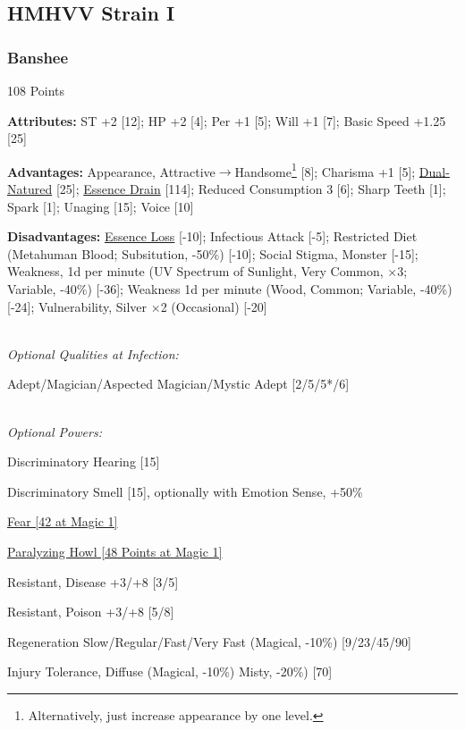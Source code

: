 \begin{multicols*}{3}
	
	\subsection*{HMHVV Strain I}
	
	\subsubsection{Banshee}\label{banshee}
	\begin{flushright}
		108 Points
	\end{flushright}
	
	\textbf{Attributes:}
	ST +2 [12]; HP +2 [4]; Per +1 [5]; Will +1 [7]; Basic Speed +1.25 [25]
	
	\textbf{Advantages:}
	Appearance, Attractive$\rightarrow$Handsome\footnote{Alternatively, just increase appearance by one level.} [8]; Charisma +1 [5]; \hyperref[dual_natured]{Dual-Natured} [25]; \hyperref[essence_drain]{Essence Drain} [114]; Reduced Consumption 3 [6]; Sharp Teeth [1]; Spark [1]; Unaging [15]; Voice [10]
	
	\textbf{Disadvantages:}	
	\hyperref[essence_loss]{Essence Loss} [-10]; Infectious Attack [-5]; Restricted Diet (Metahuman Blood; Subsitution, -50\%) [-10]; Social Stigma, Monster [-15]; Weakness, 1d per minute (UV Spectrum of Sunlight, Very Common, $\times$3; Variable, -40\%) [-36]; Weakness 1d per minute (Wood, Common; Variable, -40\%) [-24]; Vulnerability, Silver $\times$2 (Occasional) [-20]
	
	\textit{\\Optional Qualities at Infection:}
	
	Adept/Magician/Aspected Magician/Mystic Adept [2/5/5*/6]
	
	\textit{\\Optional Powers:}
	
	Discriminatory Hearing [15]
	
	Discriminatory Smell [15], optionally with Emotion Sense, +50\%
	
	\hyperref[fear]{Fear [42 at Magic 1]}
	
	\hyperref[paralyzing_howl]{Paralyzing Howl [48 Points at Magic 1]}
	
	Resistant, Disease +3/+8 [3/5]
	
	Resistant, Poison +3/+8 [5/8]
	
	Regeneration Slow/Regular/Fast/Very Fast (Magical, -10\%) [9/23/45/90]
	
	Injury Tolerance, Diffuse (Magical, -10\%) Misty, -20\%) [70]
	

\end{multicols*}

